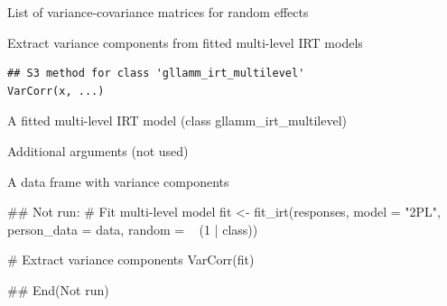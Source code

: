 \documentclass[a4paper]{book}
\begin{document}
%
\begin{Value}
List of variance-covariance matrices for random effects
\end{Value}
%
\begin{Description}
Extract variance components from fitted multi-level IRT models
\end{Description}
%
\begin{Usage}
\begin{verbatim}
## S3 method for class 'gllamm_irt_multilevel'
VarCorr(x, ...)
\end{verbatim}
\end{Usage}
%
\begin{Arguments}
\begin{ldescription}
\item[\code{x}] A fitted multi-level IRT model (class gllamm\_irt\_multilevel)

\item[\code{...}] Additional arguments (not used)
\end{ldescription}
\end{Arguments}
%
\begin{Value}
A data frame with variance components
\end{Value}
%
\begin{Examples}
\begin{ExampleCode}
## Not run: 
# Fit multi-level model
fit <- fit_irt(responses, model = "2PL",
               person_data = data, random = ~ (1 | class))

# Extract variance components
VarCorr(fit)

## End(Not run)

\end{ExampleCode}
\end{Examples}
\printindex{}
\end{document}
